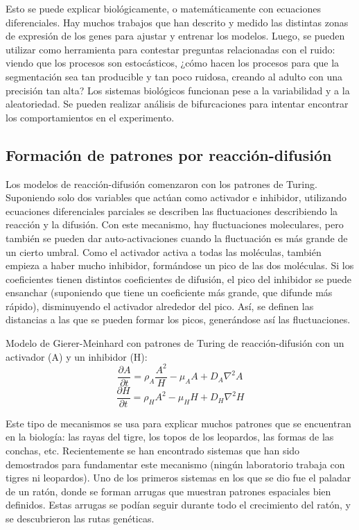 \documentclass[nochap]{config/ejercicios}
\begin{document}
Esto se puede explicar biológicamente, o matemáticamente con ecuaciones diferenciales. Hay muchos trabajos que han descrito y medido las distintas zonas de expresión de los genes para ajustar y entrenar los modelos. Luego, se pueden utilizar como herramienta para contestar preguntas relacionadas con el ruido: viendo que los procesos son estocásticos, ¿cómo hacen los procesos para que la segmentación sea tan producible y tan poco ruidosa, creando al adulto con una precisión tan alta? Los sistemas biológicos funcionan pese a la variabilidad y a la aleatoriedad.
Se pueden realizar análisis de bifurcaciones para intentar encontrar los comportamientos en el experimento. 

\subsection{Formación de patrones por reacción-difusión}
Los modelos de reacción-difusión comenzaron con los patrones de Turing. Suponiendo solo dos variables que actúan como activador e inhibidor, utilizando ecuaciones diferenciales parciales se describen las fluctuaciones describiendo la reacción y la difusión. Con este mecanismo, hay fluctuaciones moleculares, pero también se pueden dar auto-activaciones cuando la fluctuación es más grande de un cierto umbral. Como el activador activa a todas las moléculas, también empieza a haber mucho inhibidor, formándose un pico de las dos moléculas. Si los coeficientes tienen distintos coeficientes de difusión, el pico del inhibidor se puede ensanchar (suponiendo que tiene un coeficiente más grande, que difunde más rápido), disminuyendo el activador alrededor del pico. Así, se definen las distancias a las que se pueden formar los picos, generándose así las fluctuaciones.

Modelo de Gierer-Meinhard con patrones de Turing de reacción-difusión con un activador (A) y un inhibidor (H):
$$\frac{\partial A}{\partial t} = \rho_A \frac{A^2}{H} - \mu_A A + D_A \nabla^2 A$$
$$\frac{\partial H}{\partial t} = \rho_H A^2 - \mu_H H + D_H \nabla^2 H$$

Este tipo de mecanismos se usa para explicar muchos patrones que se encuentran en la biología: las rayas del tigre, los topos de los leopardos, las formas de las conchas, etc. Recientemente se han encontrado sistemas que han sido demostrados para fundamentar este mecanismo (ningún laboratorio trabaja con tigres ni leopardos). Uno de los primeros sistemas en los que se dio fue el paladar de un ratón, donde se forman arrugas que muestran patrones espaciales bien definidos. Estas arrugas se podían seguir durante todo el crecimiento del ratón, y se descubrieron las rutas genéticas.
\end{document}

